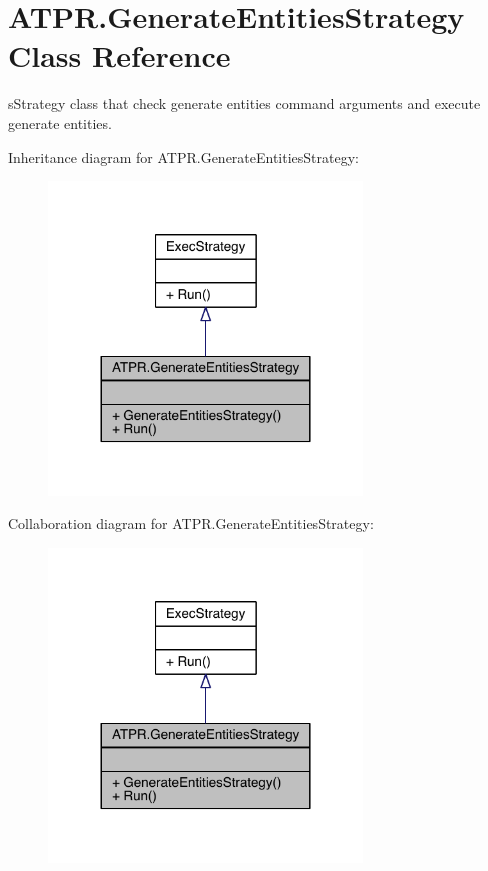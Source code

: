 \hypertarget{class_a_t_p_r_1_1_generate_entities_strategy}{}\section{A\+T\+P\+R.\+Generate\+Entities\+Strategy Class Reference}
\label{class_a_t_p_r_1_1_generate_entities_strategy}


s\+Strategy class that check generate entities command arguments and execute generate entities.  




Inheritance diagram for A\+T\+P\+R.\+Generate\+Entities\+Strategy\+:
\nopagebreak
\begin{figure}[H]
\begin{center}
\leavevmode
\includegraphics[width=236pt]{de/d9b/class_a_t_p_r_1_1_generate_entities_strategy__inherit__graph}
\end{center}
\end{figure}


Collaboration diagram for A\+T\+P\+R.\+Generate\+Entities\+Strategy\+:
\nopagebreak
\begin{figure}[H]
\begin{center}
\leavevmode
\includegraphics[width=236pt]{d1/d22/class_a_t_p_r_1_1_generate_entities_strategy__coll__graph}
\end{center}
\end{figure}

